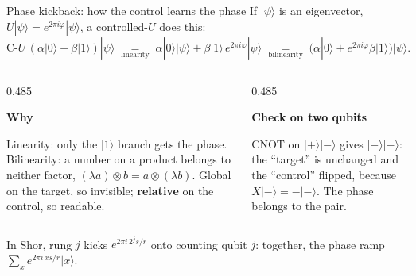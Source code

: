 \documentclass[aspectratio=169,11pt]{beamer}
\newcommand{\blocktitle}[1]{{\bfseries #1}\par\vskip1mm}
\begin{document}
{
\begin{frame}[noframenumbering]{Phase kickback: how the control learns the phase}
  \small
  If $|\psi\rangle$ is an eigenvector, $U|\psi\rangle=e^{2\pi i\varphi}|\psi\rangle$, a controlled-$U$ does this:
  \[ \text{C-}U\,(\alpha|0\rangle+\beta|1\rangle)|\psi\rangle
     \;\underset{\text{linearity}}{=}\;\alpha|0\rangle|\psi\rangle+\beta|1\rangle\,e^{2\pi i\varphi}|\psi\rangle
     \;\underset{\text{bilinearity}}{=}\;\big(\alpha|0\rangle+e^{2\pi i\varphi}\beta|1\rangle\big)|\psi\rangle . \]
  \begin{columns}[T,onlytextwidth]
    \begin{column}{0.485\textwidth}
      \begin{panel}[equal height group=kb]
        \blocktitle{Why}
        Linearity: only the $|1\rangle$ branch gets the phase. Bilinearity: a number on a product belongs to neither factor, $(\lambda a)\otimes b=a\otimes(\lambda b)$. Global on the target, so invisible; \textbf{relative} on the control, so readable.
      \end{panel}
    \end{column}
    \begin{column}{0.485\textwidth}
      \begin{panel}[equal height group=kb]
        \blocktitle{Check on two qubits}
        CNOT on $|+\rangle|-\rangle$ gives $|-\rangle|-\rangle$: the ``target'' is unchanged and the ``control'' flipped, because $X|-\rangle=-|-\rangle$. The phase belongs to the pair.
      \end{panel}
    \end{column}
  \end{columns}
  \vskip1mm
  \begin{takeaway}In Shor, rung $j$ kicks $e^{2\pi i\,2^j s/r}$ onto counting qubit $j$: together, the phase ramp $\sum_x e^{2\pi i\,x s/r}|x\rangle$.\end{takeaway}
\end{frame}}
\end{document}
